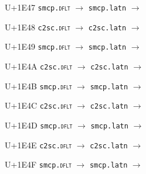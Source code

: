\documentclass{article}
\begin{document}
\begin{substitutions}
\goodbreak

U+1E47  \linebreak
    \texttt{smcp.\textsc{dflt}} $\to$  \linebreak
    \texttt{smcp.latn} $\to$  

\goodbreak

U+1E48  \linebreak
    \texttt{c2sc.\textsc{dflt}} $\to$  \linebreak
    \texttt{c2sc.latn} $\to$  

\goodbreak

U+1E49  \linebreak
    \texttt{smcp.\textsc{dflt}} $\to$  \linebreak
    \texttt{smcp.latn} $\to$  

\goodbreak

U+1E4A  \linebreak
    \texttt{c2sc.\textsc{dflt}} $\to$  \linebreak
    \texttt{c2sc.latn} $\to$  

\goodbreak

U+1E4B  \linebreak
    \texttt{smcp.\textsc{dflt}} $\to$  \linebreak
    \texttt{smcp.latn} $\to$  

\goodbreak

U+1E4C  \linebreak
    \texttt{c2sc.\textsc{dflt}} $\to$  \linebreak
    \texttt{c2sc.latn} $\to$  

\goodbreak

U+1E4D  \linebreak
    \texttt{smcp.\textsc{dflt}} $\to$  \linebreak
    \texttt{smcp.latn} $\to$  

\goodbreak

U+1E4E  \linebreak
    \texttt{c2sc.\textsc{dflt}} $\to$  \linebreak
    \texttt{c2sc.latn} $\to$  

\goodbreak

U+1E4F  \linebreak
    \texttt{smcp.\textsc{dflt}} $\to$  \linebreak
    \texttt{smcp.latn} $\to$  


\end{substitutions}
\end{document}
